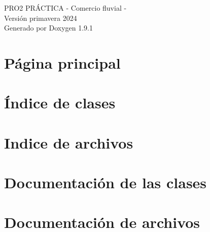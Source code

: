 \let\mypdfximage\pdfximage\def\pdfximage{\immediate\mypdfximage}\documentclass[twoside]{book}
\newcommand{\+}{\discretionary{\mbox{\scriptsize$\hookleftarrow$}}{}{}}
\newcommand{\clearemptydoublepage}{%
  \newpage{\pagestyle{empty}\cleardoublepage}%
}
\begin{document}
\raggedbottom

\hypersetup{pageanchor=false,
             bookmarksnumbered=true,
             pdfencoding=unicode
            }
\begin{titlepage}
\vspace*{7cm}
\begin{center}%
{\Large PRO2 PRÁ\+CTICA -\/ Comercio fluvial -\/ \\[1ex]\large Versión primavera 2024 }\\
\vspace*{1cm}
{\large Generado por Doxygen 1.9.1}\\
\end{center}
\end{titlepage}
\clearemptydoublepage
{}
\tableofcontents
\clearemptydoublepage
{}
\hypersetup{pageanchor=true}

\chapter{Página principal}
\label{index}\hypertarget{index}{}
\chapter{Índice de clases}

\chapter{Indice de archivos}

\chapter{Documentación de las clases}




\chapter{Documentación de archivos}










\backmatter
\newpage
{}
\clearemptydoublepage
{}
\printindex
\end{document}
